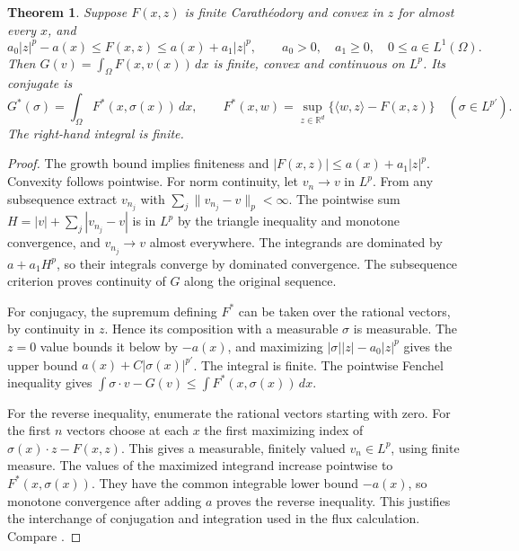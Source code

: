 \documentclass[11pt,oneside,openany]{book}
\newcommand{\R}{\mathbb R}
\newcommand{\norm}[1]{\lVert #1\rVert}
\theoremstyle{plain}
\newtheorem{theorem}{Theorem}[chapter]
\theoremstyle{definition}
\theoremstyle{remark}
\begin{document}
\begin{theorem}\label{thm:integral-conjugacy}
Suppose \(F(x,z)\) is finite Carath\'eodory and convex in \(z\)
for almost every \(x\), and
\begin{equation}\label{eq:two-sided-p-growth}
 a_0|z|^p-a(x)\le F(x,z)\le a(x)+a_1|z|^p,
 \qquad a_0>0,\quad a_1\ge0,\quad 0\le a\in L^1(\Omega).
\end{equation}
Then \(G(v)=\int_\Omega F(x,v(x))\,dx\) is finite, convex and
continuous on \(L^p\). Its conjugate is
\[
 G^*(\sigma)=\int_\Omega F^*(x,\sigma(x))\,dx,\qquad
 F^*(x,w)=\sup_{z\in\R^d}\{\langle w,z\rangle-F(x,z)\}
 \quad(\sigma\in L^{p'}).
\]
The right-hand integral is finite.
\end{theorem}

\begin{proof}
The growth bound implies finiteness and
\(|F(x,z)|\le a(x)+a_1|z|^p\). Convexity follows pointwise.
For norm continuity, let \(v_n\to v\) in \(L^p\).
From any subsequence extract \(v_{n_j}\) with
\(\sum_j\norm{v_{n_j}-v}_p<\infty\). The pointwise sum
\(H=|v|+\sum_j|v_{n_j}-v|\) is in \(L^p\) by the triangle
inequality and monotone convergence, and
\(v_{n_j}\to v\) almost everywhere. The integrands are
dominated by \(a+a_1 H^p\), so their integrals converge by
dominated convergence. The subsequence criterion proves
continuity of \(G\) along the original sequence.

For conjugacy, the supremum defining \(F^*\) can be taken
over the rational vectors, by continuity in \(z\). Hence its
composition with a measurable \(\sigma\) is measurable.
The \(z=0\) value bounds it below by \(-a(x)\), and maximizing
\(|\sigma||z|-a_0|z|^p\) gives the upper bound
\(a(x)+C|\sigma(x)|^{p'}\). The integral is finite.
The pointwise Fenchel inequality gives
\(\int \sigma\cdot v-G(v)\le\int F^*(x,\sigma(x))\,dx\).

For the reverse inequality, enumerate the rational vectors
starting with zero. For the first \(n\) vectors choose at each
\(x\) the first maximizing index of
\(\sigma(x)\cdot z-F(x,z)\). This gives a measurable,
finitely valued \(v_n\in L^p\), using finite measure.
The values of the maximized integrand increase pointwise to
\(F^*(x,\sigma(x))\). They have the common integrable lower
bound \(-a(x)\), so monotone convergence after adding \(a\)
proves the reverse inequality. This justifies the interchange
of conjugation and integration used in the flux calculation.
Compare \cite[Chapter IV, Sections 1--2]{EkelandTemam}.
\end{proof}
\end{document}
